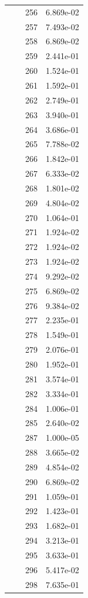 \documentclass[12pt]{article}
\begin{document}
\begin{longtable}{@{}cccc@{}}
 &  & 256 & 6.869e-02 \\
 &  & 257 & 7.493e-02 \\
 &  & 258 & 6.869e-02 \\
 &  & 259 & 2.441e-01 \\
 &  & 260 & 1.524e-01 \\
 &  & 261 & 1.592e-01 \\
 &  & 262 & 2.749e-01 \\
 &  & 263 & 3.940e-01 \\
 &  & 264 & 3.686e-01 \\
 &  & 265 & 7.788e-02 \\
 &  & 266 & 1.842e-01 \\
 &  & 267 & 6.333e-02 \\
 &  & 268 & 1.801e-02 \\
 &  & 269 & 4.804e-02 \\
 &  & 270 & 1.064e-01 \\
 &  & 271 & 1.924e-02 \\
 &  & 272 & 1.924e-02 \\
 &  & 273 & 1.924e-02 \\
 &  & 274 & 9.292e-02 \\
 &  & 275 & 6.869e-02 \\
 &  & 276 & 9.384e-02 \\
 &  & 277 & 2.235e-01 \\
 &  & 278 & 1.549e-01 \\
 &  & 279 & 2.076e-01 \\
 &  & 280 & 1.952e-01 \\
 &  & 281 & 3.574e-01 \\
 &  & 282 & 3.334e-01 \\
 &  & 284 & 1.006e-01 \\
 &  & 285 & 2.640e-02 \\
 &  & 287 & 1.000e-05 \\
 &  & 288 & 3.665e-02 \\
 &  & 289 & 4.854e-02 \\
 &  & 290 & 6.869e-02 \\
 &  & 291 & 1.059e-01 \\
 &  & 292 & 1.423e-01 \\
 &  & 293 & 1.682e-01 \\
 &  & 294 & 3.213e-01 \\
 &  & 295 & 3.633e-01 \\
 &  & 296 & 5.417e-02 \\
 &  & 298 & 7.635e-01 \\

\end{longtable}
\end{document}
